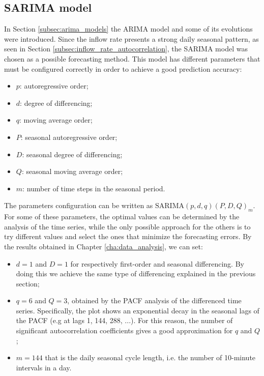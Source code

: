 \subsection{SARIMA model}
\label{subsec:sarima_model}
In Section \ref{subsec:arima_models} the ARIMA model and some of its evolutions were introduced. Since the inflow rate presents a strong daily seasonal pattern, as seen in Section \ref{subsec:inflow_rate_autocorrelation}, the SARIMA model was chosen as a possible forecasting method. This model has different parameters that must be configured correctly in order to achieve a good prediction accuracy:
\begin{itemize}
  \item \( p \): autoregressive order;
  \item \( d \): degree of differencing;
  \item \( q \): moving average order;
  \item \( P \): seasonal autoregressive order;
  \item \( D \): seasonal degree of differencing;
  \item \( Q \): seasonal moving average order;
  \item \( m \): number of time steps in the seasonal period.
\end{itemize}

The parameters configuration can be written as \( \text{SARIMA}(p,d,q)(P,D,Q)_m \). For some of these parameters, the optimal values can be determined by the analysis of the time series, while the only possible approach for the others is to try different values and select the ones that minimize the forecasting errors. By the results obtained in Chapter \ref{cha:data_analysis}, we can set:
\begin{itemize}
  \item \( d = 1 \) and \( D = 1 \) for respectively first-order and seasonal differencing. By doing this we achieve the same type of differencing explained in the previous section;
  \item \( q = 6 \) and \( Q = 3 \), obtained by the PACF analysis of the differenced time series. Specifically, the plot shows an exponential decay in the seasonal lags of the PACF (e.g at lags 1, 144, 288, ...). For this reason, the number of significant autocorrelation coefficients gives a good approximation for \( q \) and \( Q \) \cite{hyndman2018};
  \item \( m = 144 \) that is the daily seasonal cycle length, i.e. the number of 10-minute intervals in a day.
\end{itemize}

